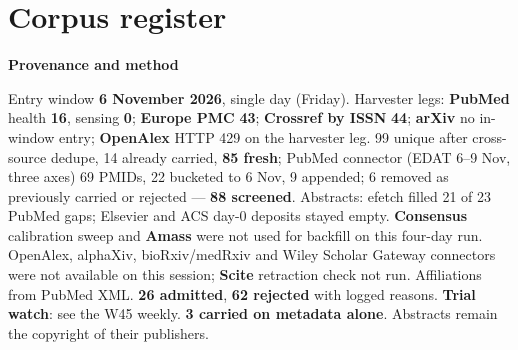 \documentclass[10pt]{article}
\begin{document}
\clearpage
\section*{\sffamily\bfseries\color{Deep}Corpus register}
\vspace{-1.5mm}{\color{Amber}\rule{\linewidth}{1.1pt}}\vspace{2.5mm}



\vspace{2mm}

\begin{keybox}
{\sffamily\bfseries\footnotesize\color{Deep}Provenance and method}\\[1.2mm]
{\fontsize{7.2}{8.8}\selectfont
Entry window \textbf{6 November 2026}, single day (Friday). Harvester legs: \textbf{PubMed} health \textbf{16}, sensing \textbf{0}; \textbf{Europe PMC} \textbf{43}; \textbf{Crossref by ISSN} \textbf{44}; \textbf{arXiv} no in-window entry; \textbf{OpenAlex} HTTP 429 on the harvester leg. 99 unique after cross-source dedupe, 14 already carried, \textbf{85 fresh}; PubMed connector (EDAT 6--9 Nov, three axes) 69 PMIDs, 22 bucketed to 6 Nov, 9 appended; 6 removed as previously carried or rejected --- \textbf{88 screened}. Abstracts: efetch filled 21 of 23 PubMed gaps; Elsevier and ACS day-0 deposits stayed empty.
\textbf{Consensus} calibration sweep and \textbf{Amass} were not used for backfill on this four-day run. OpenAlex, alphaXiv, bioRxiv/medRxiv and Wiley Scholar Gateway connectors were not available on this session; \textbf{Scite} retraction check not run. Affiliations from PubMed XML.
\textbf{26 admitted}, \textbf{62 rejected} with logged reasons. \textbf{Trial watch}: see the W45 weekly. \textbf{3 carried on metadata alone}.
Abstracts remain the copyright of their publishers.\par}
\end{keybox}
\end{document}

